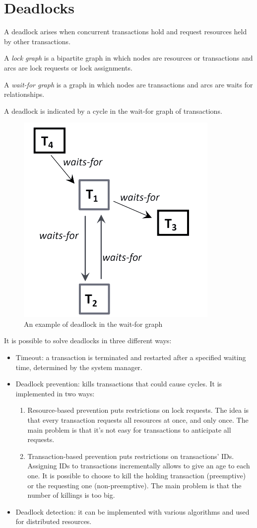 \section{Deadlocks}

A deadlock arises when concurrent transactions hold and request resources held by other transactions.
\begin{definition}
    A \emph{lock graph} is a bipartite graph in which nodes are resources or transactions and arcs are lock requests or lock assignments. 

    A \emph{wait-for graph} is a graph in which nodes are transactions and arcs are waits for relationships. 
\end{definition}
A deadlock is indicated by a cycle in the wait-for graph of transactions.
\begin{figure}[H]
    \centering
    \includegraphics[width=0.35\linewidth]{images/waitgraph.png}
    \caption{An example of deadlock in the wait-for graph}
\end{figure}
It is possible to solve deadlocks in three different ways: 
\begin{itemize}
    \item Timeout: a transaction is terminated and restarted after a specified waiting time, determined by the system manager.
    \item Deadlock prevention: kills transactions that could cause cycles. 
        It is implemented in two ways: 
        \begin{enumerate}
            \item Resource-based prevention puts restrictions on lock requests. 
                The idea is that every transaction requests all resources at once, and only once. 
                The main problem is that it's not easy for transactions to anticipate all requests. 
            \item Transaction-based prevention puts restrictions on transactions' IDs. 
                Assigning IDs to transactions incrementally allows to give an age to each one. 
                It is possible to choose to kill the holding transaction (preemptive) or the requesting one (non-preemptive). 
                The main problem is that the number of killings is too big. 
        \end{enumerate}
    \item Deadlock detection: it can be implemented with various algorithms and used for distributed resources. 
\end{itemize}
